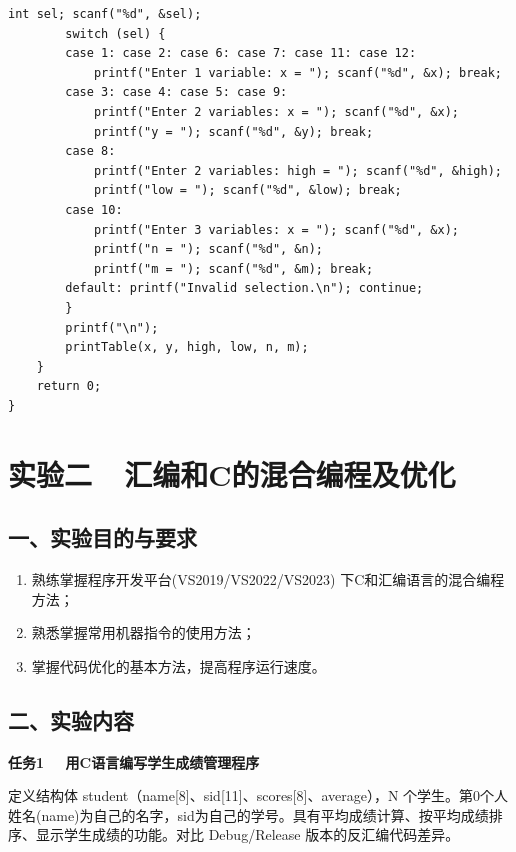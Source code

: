 \documentclass[12pt,a4paper]{ctexart}
\begin{document}
\begin{lstlisting}[basicstyle=\ttfamily\zihao{5},lineskip=-1pt]
        int sel; scanf("%d", &sel);
        switch (sel) {
        case 1: case 2: case 6: case 7: case 11: case 12:
            printf("Enter 1 variable: x = "); scanf("%d", &x); break;
        case 3: case 4: case 5: case 9:
            printf("Enter 2 variables: x = "); scanf("%d", &x);
            printf("y = "); scanf("%d", &y); break;
        case 8:
            printf("Enter 2 variables: high = "); scanf("%d", &high);
            printf("low = "); scanf("%d", &low); break;
        case 10:
            printf("Enter 3 variables: x = "); scanf("%d", &x);
            printf("n = "); scanf("%d", &n);
            printf("m = "); scanf("%d", &m); break;
        default: printf("Invalid selection.\n"); continue;
        }
        printf("\n");
        printTable(x, y, high, low, n, m);
    }
    return 0;
}
\end{lstlisting}

\newpage

\section*{实验二\ \ 汇编和C的混合编程及优化}

\subsection*{一、实验目的与要求}

\begin{enumerate}[label=（\arabic*）,nosep,leftmargin=*]
    \item 熟练掌握程序开发平台(VS2019/VS2022/VS2023) 下C和汇编语言的混合编程方法；
    \item 熟悉掌握常用机器指令的使用方法；
    \item 掌握代码优化的基本方法，提高程序运行速度。
\end{enumerate}

\subsection*{二、实验内容}

\textbf{任务1 \ \ 用C语言编写学生成绩管理程序}

定义结构体 student（name[8]、sid[11]、scores[8]、average），N 个学生。第0个人姓名(name)为自己的名字，sid为自己的学号。具有平均成绩计算、按平均成绩排序、显示学生成绩的功能。对比 Debug/Release 版本的反汇编代码差异。
\end{document}
